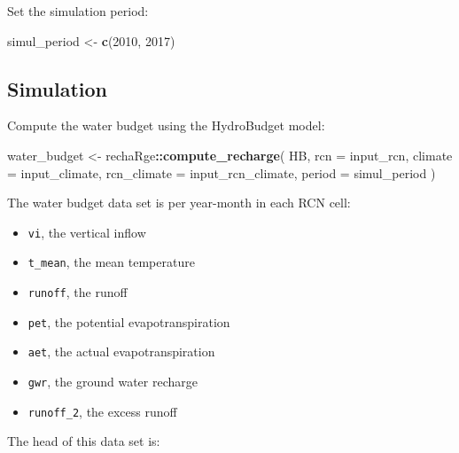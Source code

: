 \documentclass[
]{book}
\newenvironment{Shaded}{\begin{snugshade}}{\end{snugshade}}
\newcommand{\AttributeTok}[1]{\textcolor[rgb]{0.13,0.29,0.53}{#1}}
\newcommand{\DecValTok}[1]{\textcolor[rgb]{0.00,0.00,0.81}{#1}}
\newcommand{\FunctionTok}[1]{\textcolor[rgb]{0.13,0.29,0.53}{\textbf{#1}}}
\newcommand{\NormalTok}[1]{#1}
\newcommand{\OtherTok}[1]{\textcolor[rgb]{0.56,0.35,0.01}{#1}}
\newcommand{\SpecialCharTok}[1]{\textcolor[rgb]{0.81,0.36,0.00}{\textbf{#1}}}
\providecommand{\tightlist}{%
  \setlength{\itemsep}{0pt}\setlength{\parskip}{0pt}}
\begin{document}
Set the simulation period:

\begin{Shaded}
\begin{Highlighting}[]
\NormalTok{simul\_period }\OtherTok{\textless{}{-}} \FunctionTok{c}\NormalTok{(}\DecValTok{2010}\NormalTok{, }\DecValTok{2017}\NormalTok{)}
\end{Highlighting}
\end{Shaded}

\hypertarget{simulation}{%
\subsection{Simulation}\label{simulation}}

Compute the water budget using the HydroBudget model:

\begin{Shaded}
\begin{Highlighting}[]
\NormalTok{water\_budget }\OtherTok{\textless{}{-}}\NormalTok{ rechaRge}\SpecialCharTok{::}\FunctionTok{compute\_recharge}\NormalTok{(}
\NormalTok{  HB,}
  \AttributeTok{rcn =}\NormalTok{ input\_rcn,}
  \AttributeTok{climate =}\NormalTok{ input\_climate,}
  \AttributeTok{rcn\_climate =}\NormalTok{ input\_rcn\_climate,}
  \AttributeTok{period =}\NormalTok{ simul\_period}
\NormalTok{)}
\end{Highlighting}
\end{Shaded}

The water budget data set is per year-month in each RCN cell:

\begin{itemize}
\tightlist
\item
  \texttt{vi}, the vertical inflow
\item
  \texttt{t\_mean}, the mean temperature
\item
  \texttt{runoff}, the runoff
\item
  \texttt{pet}, the potential evapotranspiration
\item
  \texttt{aet}, the actual evapotranspiration
\item
  \texttt{gwr}, the ground water recharge
\item
  \texttt{runoff\_2}, the excess runoff
\end{itemize}

The head of this data set is:
\end{document}
